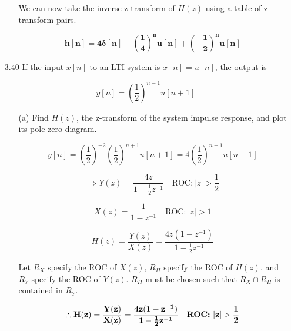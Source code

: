 \documentclass[fleqn]{article}
\makeatletter
\newenvironment{equationCenter}{\@fleqnfalse\begin{equation*}}{\end{equation*}}
\makeatother
\begin{document}
\begin{enumerate}[nolistsep]
\begin{enumerate}[nolistsep]
					We can now take the inverse z-transform of $H(z)$ using a table of z-transform pairs.
					
					\begin{equation*}
						\mathbf{h[n] = 4\delta[n] - \left(\frac{1}{4}\right)^nu[n] + \left(-\frac{1}{2}\right)^nu[n]}
					\end{equation*}
					
				\end{enumerate}
				
			\item[3.40] If the input $x[n]$ to an LTI system is $x[n] = u[n]$, the output is
				
				\begin{equationCenter}
					y[n] = \left(\frac{1}{2}\right)^{n-1}u[n+1]
				\end{equationCenter}
					
				\begin{enumerate}[nolistsep]
					\item[(a)] Find $H(z)$, the z-transform of the system impulse response, and plot its pole-zero diagram.
					
						\begin{equation*}
							y[n] = \left(\frac{1}{2}\right)^{-2}\left(\frac{1}{2}\right)^{n+1}u[n+1] = 4\left(\frac{1}{2}\right)^{n+1}u[n+1]
						\end{equation*}
						
						\begin{equation*}
							\Rightarrow Y(z) = \frac{4z}{1 - \frac{1}{2}z^{-1}}\quad \text{ROC:}\ |z| > \frac{1}{2}
						\end{equation*}
						
						\begin{equation*}
							X(z) = \frac{1}{1 - z^{-1}} \quad \text{ROC:}\ |z| > 1
						\end{equation*}
						
						\begin{equation*}
							H(z) = \frac{Y(z)}{X(z)} = \frac{4z(1 - z^{-1})}{1 - \frac{1}{2}z^{-1}}
						\end{equation*}
						
						
						Let $R_X$ specify the ROC of $X(z)$, $R_H$ specify the ROC of $H(z)$, and $R_Y$ specify the ROC of $Y(z)$. $R_H$ must be chosen such that $R_X \cap R_H$ is contained in $R_Y$. 
					
						\begin{equation*}
							\mathbf{\therefore H(z) = \frac{Y(z)}{X(z)} = \frac{4z(1 - z^{-1})}{1 - \frac{1}{2}z^{-1}}\quad \text{\textbf{ROC:}}\ |z| > \frac{1}{2}}
						\end{equation*}
						

\end{enumerate}
\end{enumerate}
\end{document}
